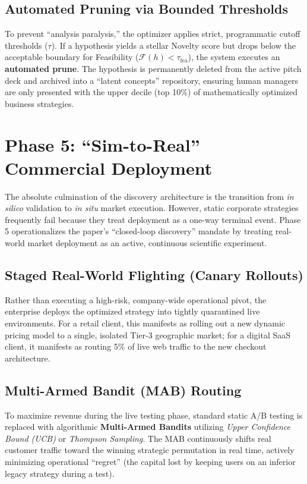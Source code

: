 \documentclass[11pt, a4paper]{article}
\begin{document}
\subsection{Automated Pruning via Bounded Thresholds}
To prevent ``analysis paralysis,'' the optimizer applies strict, programmatic cutoff thresholds ($\tau$). If a hypothesis yields a stellar Novelty score but drops below the acceptable boundary for Feasibility ($\mathcal{F}(h) < \tau_{\text{fea}}$), the system executes an \textbf{automated prune}. The hypothesis is permanently deleted from the active pitch deck and archived into a ``latent concepts'' repository, ensuring human managers are only presented with the upper decile (top 10\%) of mathematically optimized business strategies.

\section{Phase 5: ``Sim-to-Real'' Commercial Deployment}

The absolute culmination of the discovery architecture is the transition from \textit{in silico} validation to \textit{in situ} market execution. However, static corporate strategies frequently fail because they treat deployment as a one-way terminal event. Phase 5 operationalizes the paper's ``closed-loop discovery'' mandate by treating real-world market deployment as an active, continuous scientific experiment.

\subsection{Staged Real-World Flighting (Canary Rollouts)}
Rather than executing a high-risk, company-wide operational pivot, the enterprise deploys the optimized strategy into tightly quarantined live environments. For a retail client, this manifests as rolling out a new dynamic pricing model to a single, isolated Tier-3 geographic market; for a digital SaaS client, it manifests as routing 5\% of live web traffic to the new checkout architecture. 

\subsection{Multi-Armed Bandit (MAB) Routing}
To maximize revenue during the live testing phase, standard static A/B testing is replaced with algorithmic \textbf{Multi-Armed Bandits} utilizing \textit{Upper Confidence Bound (UCB)} or \textit{Thompson Sampling}. The MAB continuously shifts real customer traffic toward the winning strategic permutation in real time, actively minimizing operational ``regret'' (the capital lost by keeping users on an inferior legacy strategy during a test).
\end{document}
